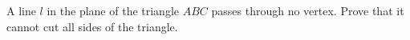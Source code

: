 A line $l$ in the plane of the triangle $ABC$ passes through no vertex. Prove that it cannot cut all sides of the triangle.
